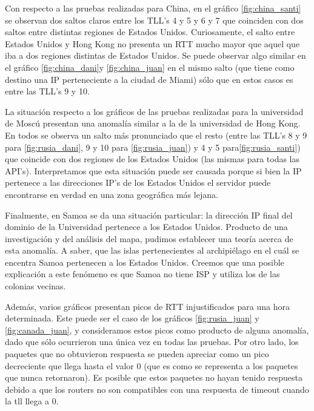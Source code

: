 Con respecto a las pruebas realizadas para China, en el gráfico \ref{fig:china_santi} se observan dos saltos claros entre los TLL's 4 y 5 y 6 y 7 que coinciden con dos saltos entre distintas regiones de Estados Unidos. Curiosamente, el salto entre Estados Unidos y Hong Kong no presenta un RTT mucho mayor que aquel que iba a dos regiones distintas de Estados Unidos. Se puede observar algo similar en el gráfico \ref{fig:china_dani}y \ref{fig:china_juan} en el mismo salto (que tiene como destino una IP perteneciente a la ciudad de Miami) sólo que en estos casos es entre las TLL's 9 y 10.


 

La situación respecto a los gráficos de las pruebas realizadas para la universidad de Moscú presentan una anomalía similar a la de la universidad de Hong Kong. En todos se observa un salto más pronunciado que el resto (entre las TLL's 8 y 9 para \ref{fig:rusia_dani}, 9 y 10 para \ref{fig:rusia_juan}) y 4 y 5 para\ref{fig:rusia_santi}) que coincide con dos regiones de los Estados Unidos (las mismas para todas las API's). Interpretamos que esta situación puede ser causada porque si bien la IP pertenece a las direcciones IP's de los Estados Unidos el servidor puede encontrarse en verdad en una zona geográfica más lejana.


 

Finalmente, en Samoa se da una situación particular: la dirección IP final del dominio de la Universidad pertenece a los Estados Unidos. Producto de una investigación y del análisis del mapa, pudimos establecer una teoría acerca de esta anomalía. A saber, que las islas pertenecientes al archipiélago en el cuál se encentra Samoa pertenecen a los Estados Unidos. Creemos que una posible explicación a este fenómeno es que Samoa no tiene ISP y utiliza los de las colonias vecinas.




Además, varios gráficos presentan picos de RTT injustificados para una hora determinada. Este puede ser el caso de los gráficos \ref{fig:rusia_juan} y \ref{fig:canada_juan}, y consideramos estos picos como producto de alguna anomalía, dado que sólo ocurrieron una única vez en todas las pruebas. Por otro lado, los paquetes que no obtuvieron respuesta se pueden apreciar como un pico decreciente que llega hasta el valor 0 (que es como se representa a los paquetes que nunca retornaron). Es posible que estos paquetes no hayan tenido respuesta debido a que los routers no son compatibles con una respuesta de timeout cuando la tll llega a 0.



